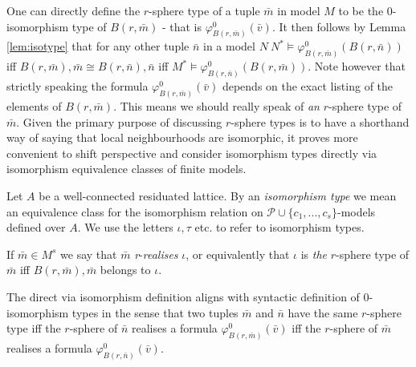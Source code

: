 \documentclass{lmcs} %
\newcommand{\?}{\ensuremath{\mkern0.4\thinmuskip}}
\let\isom=\cong%
\let\phi=\varphi
\newcommand{\CP}{\mathcal{P}}
\begin{document}
One can directly define the $r$-sphere type of a tuple $\bar{m}$ in model $M$ to be the $0$-isomorphism type of $B(r,\bar{m})$ - that is $\phi^0_{B(r,\bar{m})}(\bar{v})$. It then follows by Lemma \ref{lem:isotype} that for any other tuple $\bar{n}$ in a model $N\ N^\ast\models\phi^0_{B(r,\bar{m})}(B(r,\bar{n}))$ iff $B(r,\bar{m}),\bar{m}\isom B(r,\bar{n}),\bar{n}$ iff $M^\ast\models\phi^0_{B(r,\bar{n})}(B(r,\bar{m}))$. Note however that strictly speaking the formula $\phi^0_{B(r,\bar{m})}(\bar{v})$ depends on the exact listing of the elements of $B(r,\bar{m})$. This means we should really speak of \textit{an} $r$-sphere type of $\bar{m}$. Given the primary purpose of discussing $r$-sphere types is to have a shorthand way of saying that local neighbourhoods are isomorphic, it proves more convenient to shift perspective and consider isomorphism types directly via isomorphism equivalence classes of finite models.
\begin{defi}
    Let $A$ be a well-connected residuated lattice. By an \textit{isomorphism type} we mean an equivalence class for the isomorphism relation on $\CP\cup\{c_1,...,c_s\}$-models defined over $A$. We use the letters $\iota,\tau$ etc. to refer to isomorphism types. 
    
    If $\bar{m}\in M^s$ we say that $\bar{m}$ \textit{r}-\textit{realises} $\iota$, or equivalently that $\iota$ is \textit{the} $r$-sphere type of $\bar{m}$ iff $B(r,\bar{m}),\bar{m}$ belongs to $\iota$.  
\end{defi}
\begin{rem}\label{rem:isotypes}
    The direct via isomorphism definition aligns with syntactic definition of $0$-isomorphism types in the sense that two tuples $\bar{m}$ and $\bar{n}$ have the same $r$-sphere type iff the $r$-sphere of $\bar{n}$ realises a formula $\phi^0_{B(r,\bar{m})}(\bar{v})$ iff the $r$-sphere of $\bar{m}$ realises a formula $\phi^0_{B(r,\bar{n})}(\bar{v})$.  
\end{rem}
\end{document}
